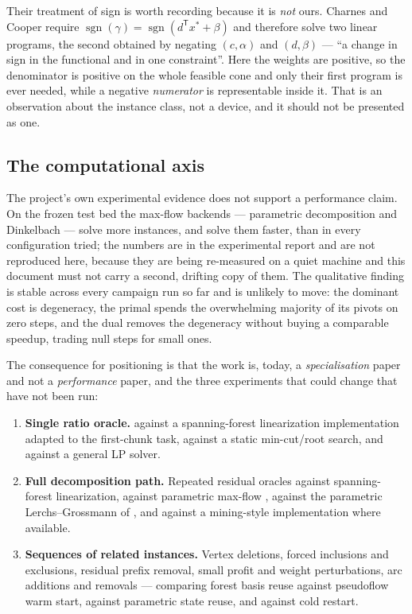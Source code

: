 \begin{enumerate}[label=Q\arabic*.,leftmargin=*]
      Their treatment of sign is worth recording because it is \emph{not} ours.
      Charnes and Cooper require $\operatorname{sgn}(\gamma) =
      \operatorname{sgn}(d^{\mathsf T}x^\ast + \beta)$ and therefore solve two
      linear programs, the second obtained by negating $(c,\alpha)$ and
      $(d,\beta)$ --- ``a change in sign in the functional and in one
      constraint''. Here the weights are positive, so the denominator is
      positive on the whole feasible cone and only their first program is ever
      needed, while a negative \emph{numerator} is representable inside it.
      That is an observation about the instance class, not a device, and it
      should not be presented as one.
\end{enumerate}

\subsection{The computational axis}

The project's own experimental evidence does not support a performance claim.
On the frozen test bed the max-flow backends --- parametric decomposition and
Dinkelbach --- solve more instances, and solve them faster, than \FS{} in every
configuration tried; the numbers are in the experimental report and are not
reproduced here, because they are being re-measured on a quiet machine and this
document must not carry a second, drifting copy of them. The qualitative
finding is stable across every campaign run so far and is unlikely to move: the
dominant cost is degeneracy, the primal spends the overwhelming majority of its
pivots on zero steps, and the dual removes the degeneracy without buying a
comparable speedup, trading null steps for small ones.

The consequence for positioning is that the work is, today, a
\emph{specialisation} paper and not a \emph{performance} paper, and the three
experiments that could change that have not been run:

\begin{enumerate}[label=E\arabic*.,leftmargin=*]
\item \textbf{Single ratio oracle.} \FS{} against a spanning-forest
      linearization implementation adapted to the first-chunk task, against a
      static min-cut/root search, and against a general LP solver.
\item \textbf{Full decomposition path.} Repeated residual oracles against
      spanning-forest linearization, against parametric max-flow
      \citep{GalloEtAl1989}, against the parametric Lerchs--Grossmann of
      \citet{Hochbaum2001}, and against a mining-style implementation
      \citep{ByunDimitrakopoulos2013} where available.
\item \textbf{Sequences of related instances.} Vertex deletions, forced
      inclusions and exclusions, residual prefix removal, small profit and
      weight perturbations, arc additions and removals --- comparing forest
      basis reuse against pseudoflow warm start, against parametric state
      reuse, and against cold restart.
\end{enumerate}

